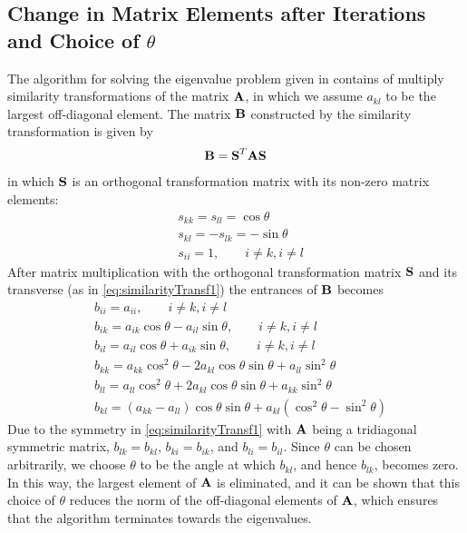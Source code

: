 \subsection{Change in Matrix Elements after Iterations and Choice of $\theta$}
\label{subsec:MatrixElementChange}
The algorithm for solving the eigenvalue problem given in  contains of multiply similarity transformations of the matrix $\mbox{\textbf{A}}$, in which we assume $a_{kl}$ to be the largest off-diagonal element.
The matrix $\mbox{\textbf{B}}$ constructed by the similarity transformation is given by
\begin{align}
	\mbox{\textbf{B}} = \mbox{\textbf{S}}^T \mbox{\textbf{A}} \mbox{\textbf{S}}
	\label{eq:similarityTransf1}
\end{align}
in which $\mbox{\textbf{S}}$ is an orthogonal transformation matrix with its non-zero matrix elements:
\begin{align*}
	& s_{kk} = s_{ll} = \cos \theta
	\\
	& s_{kl} = -s_{lk} = -\sin \theta 
	\\
	& s_{ii} = 1 , \qquad i \neq k , i \neq l
\end{align*}
After matrix multiplication with the orthogonal transformation matrix $\mbox{\textbf{S}}$ and its transverse (as in \eqref{eq:similarityTransf1}) the entrances of $\mbox{\textbf{B}}$ becomes
\begin{align*}
	& b_{ii} = a_{ii}, \qquad i \neq k, i \neq l
	\\
	& b_{ik} = a_{ik} \cos \theta - a_{il} \sin \theta , \qquad i \neq k , i \neq l
	\\
	& b_{il} = a_{il} \cos \theta + a_{ik} \sin \theta , \qquad i \neq k , i \neq l
	\\
	& b_{kk} = a_{kk} \cos ^2 \theta - 2 a_{kl} \cos \theta \sin \theta + a_{ll} \sin ^2 \theta
	\\
	 &b_{ll} = a_{ll} \cos ^2 \theta + 2 a_{kl} \cos \theta \sin \theta + a_{kk} \sin ^2 \theta
	\\
	& b_{kl} = (a_{kk} - a_{ll} ) \cos \theta \sin \theta + a_{kl} (\cos ^2 \theta - \sin ^2 \theta )
\end{align*}
Due to the symmetry in \eqref{eq:similarityTransf1} with $\mbox{\textbf{A}}$ being a tridiagonal symmetric matrix, $b_{lk} = b_{kl}$, $b_{ki} = b_{ik}$, and $b_{li} = b_{il}$.
Since $\theta$ can be chosen arbitrarily, we choose $\theta$ to be the angle at which $b_{kl}$, and hence $b_{lk}$, becomes zero.
In this way, the largest element of $\mbox{\textbf{A}}$ is eliminated, and it can be shown that this choice of $\theta$ reduces the norm of the off-diagonal elements of $\mbox{\textbf{A}}$, which ensures that the algorithm terminates towards the eigenvalues.

